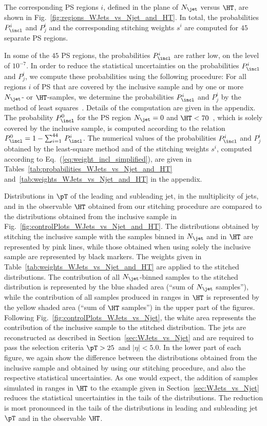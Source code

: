 The corresponding PS regions $i$, defined in the plane of $N_{\jet}$ versus $\HT$, are shown in Fig.~\ref{fig:regions_WJets_vs_Njet_and_HT}.
In total, the probabilities $P_{\incl}^{i}$ and $P_{j}^{i}$ and the corresponding stitching weights $s^{i}$ are computed for $45$ separate PS regions.

In some of the $45$ PS regions, the probabilities $P_{\incl}^{i}$ are rather low, on the level of $10^{-7}$.
In order to reduce the statistical uncertainties on the probabilities $P_{\incl}^{i}$ and $P_{j}^{i}$,
we compute these probabilities using the following procedure:
For all regions $i$ of PS that are covered by the inclusive sample and by one or more $N_{\jet}$- or $\HT$-samples,
we determine the probabilities $P_{\incl}^{i}$ and $P_{j}^{i}$ by the method of least squares~\cite{Cowan:1998ji}.
Details of the computation are given in the appendix.
The probability $P_{\incl}^{0}$ for the PS region $N_{\jet} = 0$ and $\HT < 70$~\GeV,
which is solely covered by the inclusive sample,
is computed according to the relation $P_{\incl}^{0} = 1 - \sum_{i=1}^{44} \, P_{\incl}^{i}$.
The numerical values of the probabilities $P_{\incl}^{i}$ and $P_{j}^{i}$ obtained by the least-square method
and of the stitching weights $s^{i}$, computed according to Eq.~(\ref{eq:weight_incl_simplified}), are given in Tables~\ref{tab:probabilities_WJets_vs_Njet_and_HT}
and~\ref{tab:weights_WJets_vs_Njet_and_HT} in the appendix.

Distributions in $\pT$ of the leading and subleading jet,
in the multiplicity of jets, and in the observable $\HT$ 
obtained from our stitching procedure are compared to the distributions obtained from the inclusive sample in Fig.~\ref{fig:controlPlots_WJets_vs_Njet_and_HT}.
The distributions obtained by stitching the inclusive sample with the samples binned in $N_{\jet}$ and in $\HT$ are represented by pink lines,
while those obtained when using solely the inclusive sample are represented by black markers.
The weights given in Table~\ref{tab:weights_WJets_vs_Njet_and_HT} are applied to the stitched distributions.
The contribution of all $N_{\jet}$-binned samples to the stitched distribution is represented by the blue shaded area (``sum of $N_{\jet}$ samples''),
while the contribution of all samples produced in ranges in $\HT$ is represented by the yellow shaded area (``sum of $\HT$ samples'') in the upper part of the figures.
Following Fig.~\ref{fig:controlPlots_WJets_vs_Njet},
the white area represents the contribution of the inclusive sample to the stitched distribution.
The jets are reconstructed as described in Section~\ref{sec:WJets_vs_Njet} and are required to pass the selection criteria $\pT > 25$~\GeV and $\vert\eta\vert < 5.0$.
In the lower part of each figure, we again show the difference between the distributions obtained from the inclusive sample and obtained by using our stitching procedure,
and also the respective statistical uncertainties.
As one would expect, the addition of samples simulated in ranges in $\HT$ to the example given in Section~\ref{sec:WJets_vs_Njet}
reduces the statistical uncertainties in the tails of the distributions.
The reduction is most pronounced in the tails of the distributions in leading and subleading jet $\pT$ and in the observable $\HT$.

